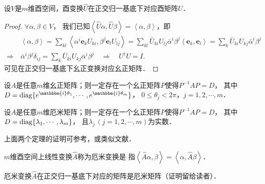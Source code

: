 \begin{theorem}
    设$V$是$m$维酉空间，酉变换$\hat{U}$在正交归一基底下对应酉矩阵$U$．
\end{theorem}
\begin{proof}
    $\forall \alpha,\beta \in V$，
    我们已知$\left<\hat{U}\alpha,\hat{U}\beta\right>=\left<\alpha,\beta\right>$，即
    \begin{align*}
        &\left<\alpha,\beta\right>=\sum_{kl}\left<\alpha^i \boldsymbol{e}_k U_{ki}, \beta^j \boldsymbol{e}_l U_{lj} \right>
        =\sum_{kl}\bar{U}_{ki} U_{lj} \bar{\alpha}^i \beta^j \left< \boldsymbol{e}_k, \boldsymbol{e}_l\right>
        =\sum_k \bar{U}_{ki} U_{kj} \bar{\alpha}^i \beta^j \\
        \Rightarrow\ & \bar{\alpha}^i \beta^j \delta_{ij}=\sum\nolimits_k \bar{U}_{ki} U_{kj} \bar{\alpha}^i \beta^j 
        \quad \Rightarrow \quad U^\dagger U = I.
    \end{align*}
    可见在正交归一基底下幺正变换对应幺正矩阵．
\end{proof}



\begin{theorem}\label{chcx:thm_UD}
	设$A$是任意$m$维幺正矩阵；则一定存在一个幺正矩阵$P$使得$P^{-1}A P=D$，
	其中$D={\rm diag}\{e^{\mathbbm{i}\theta_1},\cdots,e^{\mathbbm{i}\theta_m}\}$，
	$0\leqslant \theta_j <2\pi$，$j=1,2,\cdots,m$．
\end{theorem}


\begin{theorem}\label{chcx:thm_CD}
	设$A$是任意$m$维厄米矩阵；则一定存在一个幺正矩阵$P$使得$P^{-1}A P=D$，
	其中$D={\rm diag}\{\lambda_1,\cdots,\lambda_m\}$，
	且$\lambda_j \, (j=1,2,\cdots,m)$为实数．
\end{theorem}


上面两个定理的证明可参考\parencite[p.522]{qiuws-2019-v2}，或类似文献．




\begin{definition}
	$m$维酉空间上线性变换$\hat{A}$称为{\heiti 厄米变换}是
	指$\left<\hat{A}\alpha,\beta\right>=\left<\alpha,\hat{A}\beta\right>$．
\end{definition}
厄米变换$\hat{A}$在正交归一基底下对应的矩阵是厄米矩阵（证明留给读者）．






